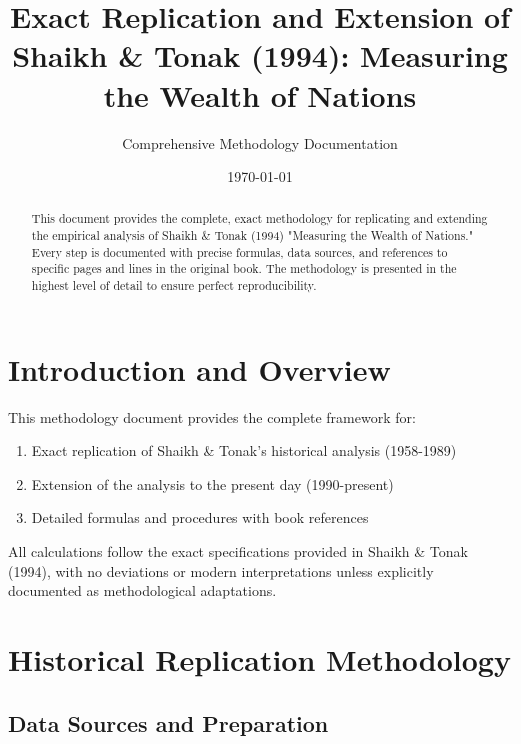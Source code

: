 \documentclass[12pt,a4paper]{article}
\title{Exact Replication and Extension of Shaikh \& Tonak (1994): Measuring the Wealth of Nations}
\author{Comprehensive Methodology Documentation}
\date{\today}
\begin{document}
\maketitle

\begin{abstract}
This document provides the complete, exact methodology for replicating and extending the empirical analysis of Shaikh \& Tonak (1994) "Measuring the Wealth of Nations." Every step is documented with precise formulas, data sources, and references to specific pages and lines in the original book. The methodology is presented in the highest level of detail to ensure perfect reproducibility.
\end{abstract}

\tableofcontents
\newpage

\section{Introduction and Overview}

This methodology document provides the complete framework for:
\begin{enumerate}
    \item Exact replication of Shaikh \& Tonak's historical analysis (1958-1989)
    \item Extension of the analysis to the present day (1990-present)
    \item Detailed formulas and procedures with book references
\end{enumerate}

All calculations follow the exact specifications provided in Shaikh \& Tonak (1994), with no deviations or modern interpretations unless explicitly documented as methodological adaptations.

\section{Historical Replication Methodology}

\subsection{Data Sources and Preparation}
\end{document}
